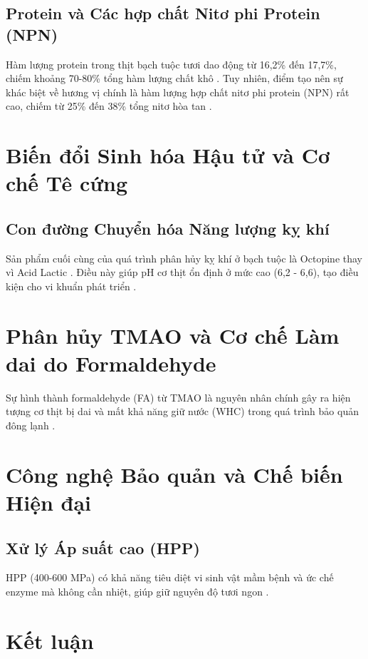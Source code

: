 \documentclass[12pt,a4paper]{report}
\begin{document}
\subsection{Protein và Các hợp chất Nitơ phi Protein (NPN)}

Hàm lượng protein trong thịt bạch tuộc tươi dao động từ 16,2\% đến 17,7\%, chiếm khoảng 70-80\% tổng hàm lượng chất khô \cite{mdpi_algarve}. Tuy nhiên, điểm tạo nên sự khác biệt về hương vị chính là hàm lượng hợp chất nitơ phi protein (NPN) rất cao, chiếm từ 25\% đến 38\% tổng nitơ hòa tan \cite{researchgate_amino}.

\section{Biến đổi Sinh hóa Hậu tử và Cơ chế Tê cứng}

\subsection{Con đường Chuyển hóa Năng lượng kỵ khí}

Sản phẩm cuối cùng của quá trình phân hủy kỵ khí ở bạch tuộc là Octopine thay vì Acid Lactic \cite{fao_ch10}. Điều này giúp pH cơ thịt ổn định ở mức cao (6,2 - 6,6), tạo điều kiện cho vi khuẩn phát triển \cite{scielo_quality}.

\section{Phân hủy TMAO và Cơ chế Làm dai do Formaldehyde}

Sự hình thành formaldehyde (FA) từ TMAO là nguyên nhân chính gây ra hiện tượng cơ thịt bị dai và mất khả năng giữ nước (WHC) trong quá trình bảo quản đông lạnh \cite{researchgate_fa, pmc_crosslinking}.

\section{Công nghệ Bảo quản và Chế biến Hiện đại}

\subsection{Xử lý Áp suất cao (HPP)}

HPP (400-600 MPa) có khả năng tiêu diệt vi sinh vật mầm bệnh và ức chế enzyme mà không cần nhiệt, giúp giữ nguyên độ tươi ngon \cite{hiperbaric_hpp}.

\section{Kết luận}
\end{document}
